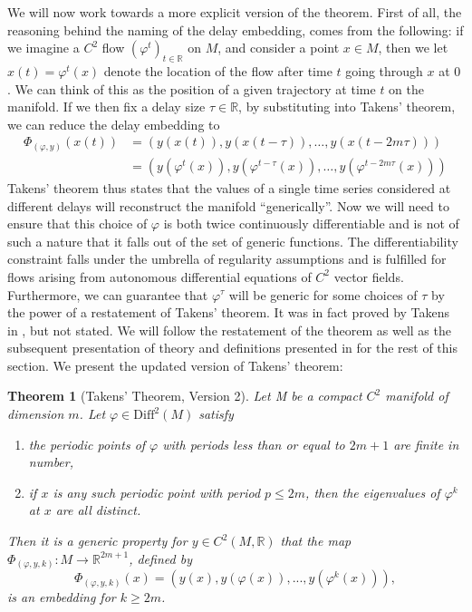 \documentclass[11pt, a4paper]{memoir}
\theoremstyle{break}
\newtheorem{thm}{Theorem}
\theoremstyle{break}
\theoremstyle{nonumberplain}
\newcommand{\mR}{\mathbb{R}}
\begin{document}
We will now work towards a more explicit version of the theorem. First of all, the reasoning behind the naming of the delay embedding, comes from the following: if we imagine a $C^2$ flow $(\varphi^t)_{t\in \mR}$ on $M$, and consider a point $x\in M$, then we let $x(t)=\varphi^t(x)$ denote the location of the flow after time $t$ going through $x$ at $0$. We can think of this as the position of a given trajectory at time $t$ on the manifold. If we then fix a delay size $\tau\in \mR$, by substituting into Takens' theorem, we can reduce the delay embedding to
\begin{align*}
\Phi_{(\varphi,y)}(x(t))&=\left(y(x(t)),y(x(t-\tau)),\ldots,y(x(t-2m\tau))\right)\\
&=\left(y(\varphi^t(x)),y(\varphi^{t-\tau}(x)),\ldots,y(\varphi^{t-2m\tau}(x))\right)
\end{align*}
Takens' theorem thus states that the values of a single time series considered at different delays will reconstruct the manifold \enquote{generically}. Now we will need to ensure that this choice of $\varphi$ is both twice continuously differentiable and is not of such a nature that it falls out of the set of generic functions. The differentiability constraint falls under the umbrella of regularity assumptions and is fulfilled for flows arising from autonomous differential equations of $C^2$ vector fields. Furthermore, we can guarantee that $\varphi^\tau$ will be generic for some choices of $\tau$ by the power of a restatement of Takens' theorem. It was in fact proved by Takens in \cite{Takens}, but not stated. We will follow the restatement of the theorem as well as the subsequent presentation of theory and definitions presented in \cite{Huke} for the rest of this section. We present the updated version of Takens' theorem:
\begin{thm}[Takens' Theorem, Version 2]\label{v2}
Let M be a compact $C^2$ manifold of dimension $m$. Let $\varphi\in\text{Diff}^2(M)$ satisfy
\begin{enumerate}[label=\arabic*)]
	\item the periodic points of $\varphi$ with periods less than or equal to $2m+1$ are finite in number,
	\item if $x$ is any such periodic point with period $p\leqslant 2m$, then the eigenvalues of $\varphi^k$ at $x$ are all distinct.
\end{enumerate}
 Then it is a generic property for $y\in C^2(M,\mR)$ that the map $\Phi_{(\varphi,y,k)}:M\to \mathbb{R}^{2m+1}$, defined by
\begin{equation}\label{delayemb}
\Phi_{(\varphi,y,k)}(x)=(y(x),y(\varphi(x)),...,y(\varphi^{k}(x))),
\end{equation}
is an embedding for $k\geqslant 2m$. \cite{Huke}
\end{thm}
\end{document}
